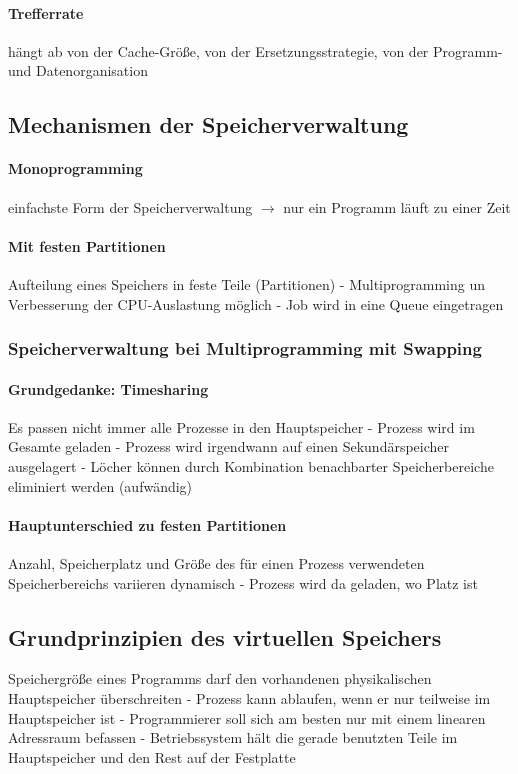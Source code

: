 \documentclass[10pt,a4paper,landscape]{article}
\begin{document}
\begin{multicols*}{3}
	\paragraph{Trefferrate} hängt ab von der Cache-Größe, von der Ersetzungsstrategie, von der Programm- und Datenorganisation
	\subsection{Mechanismen der Speicherverwaltung}
	\paragraph{Monoprogramming} einfachste Form der Speicherverwaltung $\rightarrow$ nur ein Programm läuft zu einer Zeit
	\paragraph{Mit festen Partitionen} Aufteilung eines Speichers in feste Teile (Partitionen) - Multiprogramming un Verbesserung der CPU-Auslastung möglich - Job wird in eine Queue eingetragen
	\subsubsection{Speicherverwaltung bei Multiprogramming mit Swapping}
	\paragraph{Grundgedanke: Timesharing} Es passen nicht immer alle Prozesse in den Hauptspeicher - Prozess wird im Gesamte geladen - Prozess wird irgendwann auf einen Sekundärspeicher ausgelagert - Löcher können durch Kombination benachbarter Speicherbereiche eliminiert werden (aufwändig)
	\paragraph{Hauptunterschied zu festen Partitionen} Anzahl, Speicherplatz und Größe des für einen Prozess verwendeten Speicherbereichs variieren dynamisch - Prozess wird da geladen, wo Platz ist
	\subsection{Grundprinzipien des virtuellen Speichers}
	Speichergröße eines Programms darf den vorhandenen physikalischen Hauptspeicher überschreiten - Prozess kann ablaufen, wenn er nur teilweise im Hauptspeicher ist - Programmierer soll sich am besten nur mit einem linearen Adressraum befassen - Betriebssystem hält die gerade benutzten Teile im Hauptspeicher und den Rest auf der Festplatte

\end{multicols*}
\end{document}
